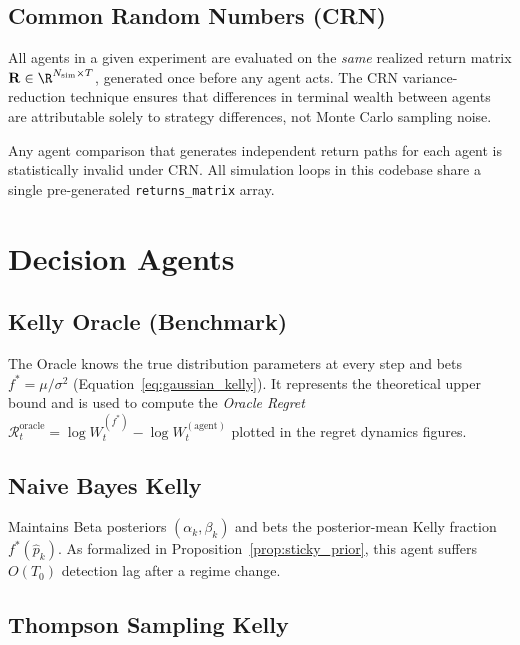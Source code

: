 \subsection{Common Random Numbers (CRN)}
\label{sec:crn}

All agents in a given experiment are evaluated on the \emph{same} realized
return matrix $\mathbf{R} \in \R^{N_{\text{sim}}\times T}$, generated once
before any agent acts.  The CRN variance-reduction technique \citep{lecuyer1994efficiency}
ensures that differences in terminal wealth between agents are attributable
solely to strategy differences, not Monte Carlo sampling noise.

\begin{remark}
Any agent comparison that generates independent return paths for each agent
is statistically invalid under CRN.  All simulation loops in this codebase
share a single pre-generated \texttt{returns\_matrix} array.
\end{remark}

\section{Decision Agents}
\label{sec:agents}

\subsection{Kelly Oracle (Benchmark)}

The Oracle knows the true distribution parameters at every step and bets
$f^* = \mu/\sigma^2$ (Equation~\eqref{eq:gaussian_kelly}).  It represents the
theoretical upper bound and is used to compute the \emph{Oracle Regret}
$\mathcal{R}_t^{\text{oracle}} = \log W_t^{(f^*)} - \log W_t^{(\text{agent})}$
plotted in the regret dynamics figures.

\subsection{Naive Bayes Kelly}

Maintains Beta posteriors $(\alpha_k,\beta_k)$ and bets the posterior-mean
Kelly fraction $f^*(\hat p_k)$.  As formalized in
Proposition~\ref{prop:sticky_prior}, this agent suffers $O(T_0)$ detection lag
after a regime change.

\subsection{Thompson Sampling Kelly}

